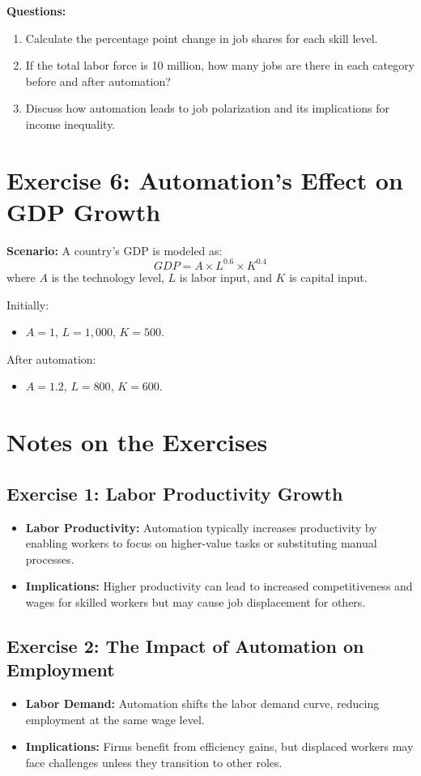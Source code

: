 \documentclass[12pt]{article}
\begin{document}
\textbf{Questions:}
\begin{enumerate}
    \item Calculate the percentage point change in job shares for each skill level.
    \item If the total labor force is 10 million, how many jobs are there in each category before and after automation?
    \item Discuss how automation leads to job polarization and its implications for income inequality.
\end{enumerate}

\section*{Exercise 6: Automation's Effect on GDP Growth}
\textbf{Scenario:} A country’s GDP is modeled as:
\[ GDP = A \times L^{0.6} \times K^{0.4} \]
where $A$ is the technology level, $L$ is labor input, and $K$ is capital input.

Initially:
\begin{itemize}
    \item $A = 1$, $L = 1,000$, $K = 500$.
\end{itemize}

After automation:
\begin{itemize}
    \item $A = 1.2$, $L = 800$, $K = 600$.
\end{itemize}

\section*{Notes on the Exercises}

\subsection*{Exercise 1: Labor Productivity Growth}
\begin{itemize}
    \item \textbf{Labor Productivity:} Automation typically increases productivity by enabling workers to focus on higher-value tasks or substituting manual processes.
    \item \textbf{Implications:} Higher productivity can lead to increased competitiveness and wages for skilled workers but may cause job displacement for others.
\end{itemize}

\subsection*{Exercise 2: The Impact of Automation on Employment}
\begin{itemize}
    \item \textbf{Labor Demand:} Automation shifts the labor demand curve, reducing employment at the same wage level.
    \item \textbf{Implications:} Firms benefit from efficiency gains, but displaced workers may face challenges unless they transition to other roles.
\end{itemize}
\end{document}
